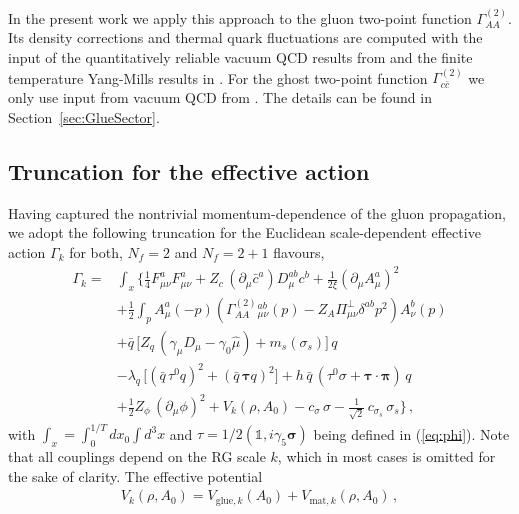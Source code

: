 \documentclass[%
reprint,
superscriptaddress,
showpacs,preprintnumbers,
 amsmath,amssymb,
 aps,
prd,
]{revtex4-1}
\def\eq#1{(\ref{#1})}
\def\sec#1{Section~\ref{#1}}
\begin{document}
In the present work we apply this approach to the gluon two-point
function $\Gamma^{(2)}_{AA}$. Its density corrections and thermal
quark fluctuations are computed with the input of the quantitatively
reliable vacuum QCD results from \cite{Cyrol:2017ewj} and the finite
temperature Yang-Mills results in \cite{Cyrol:2017qkl}.  For the ghost
two-point function $\Gamma^{(2)}_{c \bar c}$ we only use input from
vacuum QCD from \cite{Cyrol:2017ewj}.  The details can be found in
\sec{sec:GlueSector}.

\subsection{Truncation for the effective action}\label{sec:TruncAct}

Having captured the nontrivial momentum-dependence of the gluon
propagation, we adopt the following truncation for the Euclidean
scale-dependent effective action $\Gamma_k$ for both, $N_f=2$ and
$N_f=2+1$ flavours, 
%
\begin{align}
  \Gamma_{k}=&\int_{x} \bigg\{\frac{1}{4}F^a_{\mu\nu}F^a_{\mu\nu}+
               Z_{c} \,(\partial_{\mu}\bar{c}^a)D_{\mu} ^{ab}c^b+
               \frac{1}{2\xi}(\partial_{\mu} A^a_{\mu})^2\nonumber\\[1ex]
             &+ \frac12 \int_p A^a_\mu(-p) \left(
               \Gamma^{(2)}_{AA}{}^{ab}_{\mu\nu}(p) -Z_A \Pi_{\mu\nu}^{\perp}
               \delta^{ab}p^2
               \right) A^b_\nu(p)
               \nonumber\\[1ex]
             &+\bar{q}\,\bigl[Z_{q}\, (\gamma_{\mu} D_{\mu}-\gamma_0 \hat \mu)+
               m_s(\sigma_s) \bigr]\, q\,\nonumber  \\[1ex]
             &  -{\lambda_{q}}\,
               \Big[(\bar{q}\,\tau^0 q)^2 + (\bar{q}\,
               \bm{\tau} q)^2\Big]+h\,\bar{q}\,
               \left(\tau^0\sigma+\bm\tau
               \cdot\bm{\pi}\right)\,q\nonumber \\[1ex]
             &  +\frac{1}{2}Z_{\phi}\,(
               \partial_{\mu}\phi)^2 
  +V_{k}(\rho,A_0)-
               c_\sigma\,\sigma-\frac{1}{\sqrt{2}}\, c_{\sigma_s}\, \sigma_s\bigg\}\,,
               \label{eq:action}
\end{align}
%
with $\int_{x}=\int_0^{1/T}d x_0 \int d^3 x$ and
$\tau=1/2 (\mathbb{1}, i \gamma_5 \bm \sigma)$ being defined in
\eq{eq:phi}. Note that all couplings depend on the RG scale $k$,
  which in most cases is omitted for the sake of clarity. The
effective potential
%
\begin{align}\label{eq:EffPot}
  V_k(\rho,A_0) = V_{\textrm{glue},k}(A_0) + V_{\textrm{mat},k}(\rho,A_0) \,,
\end{align}
\end{document}
